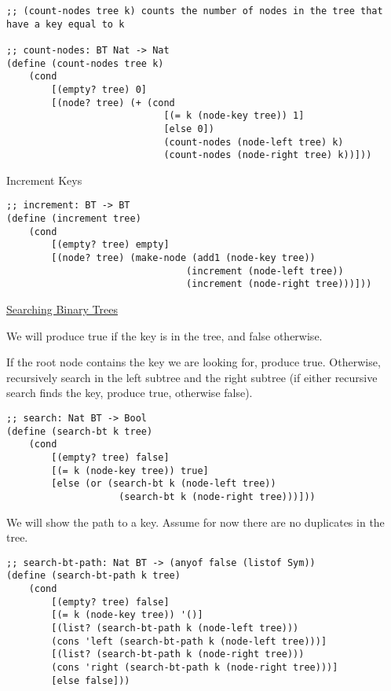 \documentclass{article}
\begin{document}
\begin{lstlisting}
;; (count-nodes tree k) counts the number of nodes in the tree that have a key equal to k

;; count-nodes: BT Nat -> Nat
(define (count-nodes tree k)
    (cond
        [(empty? tree) 0]
        [(node? tree) (+ (cond
                            [(= k (node-key tree)) 1]
                            [else 0])
                            (count-nodes (node-left tree) k)
                            (count-nodes (node-right tree) k))]))
\end{lstlisting}

Increment Keys
\begin{lstlisting}
;; increment: BT -> BT
(define (increment tree)
    (cond
        [(empty? tree) empty]
        [(node? tree) (make-node (add1 (node-key tree))
                                (increment (node-left tree))
                                (increment (node-right tree)))]))
\end{lstlisting}

\underline{Searching Binary Trees}

We will produce true if the key is in the tree, and false otherwise. 

If the root node contains the key we are looking for, produce true. Otherwise, recursively search in the left subtree and the right subtree (if either recursive search finds the key, produce true, otherwise false). 

\begin{lstlisting}
;; search: Nat BT -> Bool
(define (search-bt k tree)
    (cond
        [(empty? tree) false]
        [(= k (node-key tree)) true]
        [else (or (search-bt k (node-left tree))
                    (search-bt k (node-right tree)))]))
\end{lstlisting}

We will show the path to a key. Assume for now there are no duplicates in the tree. 

\begin{lstlisting}
;; search-bt-path: Nat BT -> (anyof false (listof Sym))
(define (search-bt-path k tree)
    (cond
        [(empty? tree) false]
        [(= k (node-key tree)) '()]
        [(list? (search-bt-path k (node-left tree)))
        (cons 'left (search-bt-path k (node-left tree)))]
        [(list? (search-bt-path k (node-right tree)))
        (cons 'right (search-bt-path k (node-right tree)))]
        [else false]))
\end{lstlisting}
\end{document}
